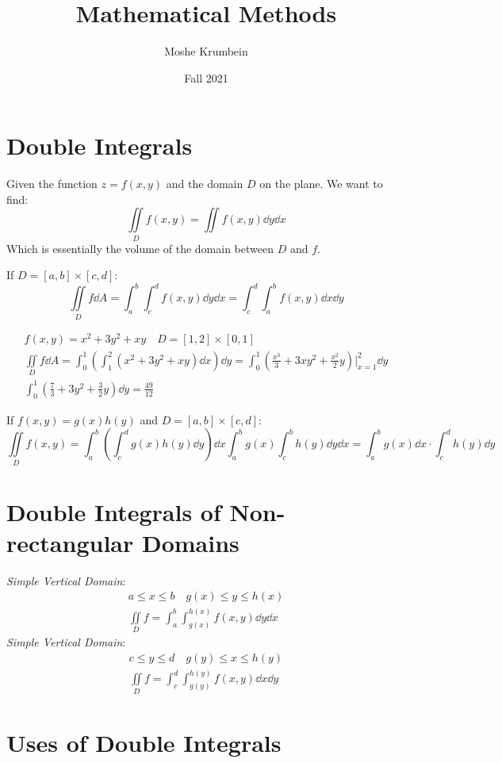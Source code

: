 \documentclass[00_complete]{subfiles}
\title{Mathematical Methods}
\author{Moshe Krumbein}
\date{Fall 2021}
\begin{document}

\section{Double Integrals}
Given the function $z=f(x,y)$ and the domain $D$ on the plane. We want to find:
$$\iint\limits_Df(x,y)=\iint f(x,y)\dd{y}\dd{x}$$
Which is essentially the volume of the domain between $D$ and $f$.
\begin{definition}
    If $D=[a,b]\times[c,d]$:
    $$\iint\limits_D f \dd{A}= \int_{a}^{b}\int_{c}^{d}
    f(x,y)\dd{y}\dd{x}=\int_{c}^{d}\int_{a}^{b} f(x,y)\dd{x}\dd{y}$$
\end{definition}
\begin{example}
    \begin{gather*}
        f(x,y)=x^2+3y^2+xy \quad D=[1,2]\times[0,1] \\
        \iint\limits_D f\dd{A} =
        \int_{0}^{1}\left(\int_{1}^{2}(x^2+3y^2+xy)\dd{x}\right)\dd{y} =
        \int_{0}^{1}\left(\frac{x^3}{3}+3xy^2+\frac{x^2}{2}y\right)\Biggr|_{x=1}^2\dd{y}
        \\
        \int_{0}^{1}\left(\frac{7}{3}+3y^2+\frac{3}{2}y\right)\dd{y}
        =\frac{49}{12}
    \end{gather*}
\end{example}
\begin{note}
    If $f(x,y)=g(x)h(y)$ and $D=[a,b]\times[c,d]$:
    $$\iint\limits_Df(x,y)=\int_{a}^{b}\left(\int_{c}^{d}g(x)h(y)\dd{y}\right)\dd{x}
    \int_{a}^{b}g(x)\int_{c}^{b}h(y)\dd{y}\dd{x} =
    \int_{a}^{b}g(x)\dd{x}\cdot\int_{c}^{d}h(y)\dd{y}
    $$
\end{note}
\section{Double Integrals of Non-rectangular Domains}
\emph{Simple Vertical Domain}:
\begin{gather*}
    a \leq x \leq b \quad g(x) \leq y \leq h(x) \\
    \iint\limits_D f= \int_{a}^{b}\int_{g(x)}^{h(x)}f(x,y)\dd{y}\dd{x}
\end{gather*}
\emph{Simple Vertical Domain}:
\begin{gather*}
    c \leq y \leq d \quad g(y) \leq x \leq h(y) \\
    \iint\limits_D f= \int_{c}^{d}\int_{g(y)}^{h(y)}f(x,y)\dd{x}\dd{y}
\end{gather*}
\section{Uses of Double Integrals}
\end{document}
